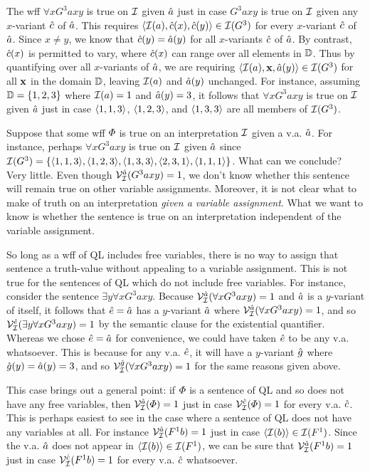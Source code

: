 The wff $\forall xG^3axy$ is true on $\mathcal{I}$ given $\hat{a}$ just in case $G^3axy$ is true on $\mathcal{I}$ given any $x$-variant $\hat{c}$ of $\hat{a}$.
This requires $\langle\mathcal{I}(a),\hat{c}(x),\hat{c}(y)\rangle\in\mathcal{I}(G^3)$ for every $x$-variant $\hat{c}$ of $\hat{a}$.
Since $x\neq y$, we know that $\hat{c}(y)=\hat{a}(y)$ for all $x$-variants $\hat{c}$ of $\hat{a}$.
By contrast, $\hat{c}(x)$ is permitted to vary, where $\hat{c}(x)$ can range over all elements in $\mathbb{D}$.
Thus by quantifying over all $x$-variants of $\hat{a}$, we are requiring $\langle\mathcal{I}(a),\mathbf{x},\hat{a}(y)\rangle\in\mathcal{I}(G^3)$ for all $\mathbf{x}$ in the domain $\mathbb{D}$, leaving $\mathcal{I}(a)$ and $\hat{a}(y)$ unchanged.
For instance, assuming $\mathbb{D}=\lbrace1,2,3\rbrace$ where $\mathcal{I}(a)=1$ and $\hat{a}(y)=3$, it follows that $\forall xG^3axy$ is true on $\mathcal{I}$ given $\hat{a}$ just in case $\langle1,1,3\rangle$, $\langle1,2,3\rangle$, and $\langle1,3,3\rangle$ are all members of $\mathcal{I}(G^3)$.

Suppose that some wff $\varPhi$ is true on an interpretation $\mathcal{I}$ given a v.a. $\hat{a}$.
For instance, perhaps $\forall xG^3axy$ is true on $\mathcal{I}$ given $\hat{a}$ since $\mathcal{I}(G^3)=\lbrace\langle1,1,3\rangle,\langle1,2,3\rangle,\langle1,3,3\rangle,\langle2,3,1\rangle,\langle1,1,1\rangle\rbrace$.
What can we conclude?
Very little.
Even though $\mathcal{V}_{\mathcal{I}}^{\hat{a}}(G^3axy)=1$, we don't know whether this sentence will remain true on other variable assignments.
Moreover, it is not clear what to make of truth on an interpretation \textit{given a variable assignment}.
What we want to know is whether the sentence is true on an interpretation independent of the variable assignment.

So long as a wff of QL includes free variables, there is no way to assign that sentence a truth-value without appealing to a variable assignment.
This is not true for the sentences of QL which do not include free variables.
For instance, consider the sentence $\exists y\forall xG^3axy$.
Because $\mathcal{V}_{\mathcal{I}}^{\hat{a}}(\forall xG^3axy)=1$ and $\hat{a}$ is a $y$-variant of itself, it follows that $\hat{e}=\hat{a}$ has a $y$-variant $\hat{a}$ where $\mathcal{V}_{\mathcal{I}}^{\hat{a}}(\forall xG^3axy)=1$, and so $\mathcal{V}_{\mathcal{I}}^{\hat{e}}(\exists y\forall xG^3axy)=1$ by the semantic clause for the existential quantifier. 
Whereas we chose $\hat{e}=\hat{a}$ for convenience, we could have taken $\hat{e}$ to be any v.a. whatsoever. 
This is because for any v.a. $\hat{e}$, it will have a $y$-variant $\hat{g}$ where $\hat{g}(y)=\hat{a}(y)=3$, and so $\mathcal{V}_{\mathcal{I}}^{\hat{g}}(\forall xG^3axy)=1$ for the same reasons given above. 

This case brings out a general point: if $\varPhi$ is a sentence of QL and so does not have any free variables, then $\mathcal{V}_{\mathcal{I}}^{\hat{a}}(\varPhi)=1$ just in case $\mathcal{V}_{\mathcal{I}}^{\hat{c}}(\varPhi)=1$ for every v.a. $\hat{c}$.
This is perhaps easiest to see in the case where a sentence of QL does not have any variables at all.
For instance $\mathcal{V}_{\mathcal{I}}^{\hat{a}}(F^1b)=1$ just in case $\langle\mathcal{I}(b)\rangle\in\mathcal{I}(F^1)$.
Since the v.a. $\hat{a}$ does not appear in $\langle\mathcal{I}(b)\rangle\in\mathcal{I}(F^1)$, we can be sure that $\mathcal{V}_{\mathcal{I}}^{\hat{a}}(F^1b)=1$ just in case $\mathcal{V}_{\mathcal{I}}^{\hat{c}}(F^1b)=1$ for every v.a. $\hat{c}$ whatsoever.

